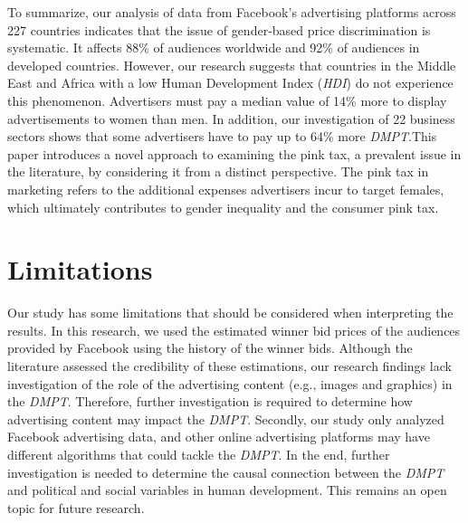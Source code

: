 \documentclass[twocolumn]{bmcart}\usepackage{lineno}
\begin{document}
To summarize, our analysis of data from Facebook's advertising platforms across 227 countries indicates that the issue of gender-based price discrimination is systematic. It affects 88\% of audiences worldwide and 92\% of audiences in developed countries. However, our research suggests that countries in the Middle East and Africa with a low Human Development Index (\emph{HDI}) do not experience this phenomenon. Advertisers must pay a median value of 14\% more to display advertisements to women than men. In addition, our investigation of 22 business sectors shows that some advertisers have to pay up to 64\% more \emph{DMPT}.This paper introduces a novel approach to examining the pink tax, a prevalent issue in the literature, by considering it from a distinct perspective. The pink tax in marketing refers to the additional expenses advertisers incur to target females, which ultimately contributes to gender inequality and the consumer pink tax. 
 
\color{black}



\section{Limitations}
\color{blue} Our study has some limitations that should be considered when interpreting the results. In this research, we used the estimated winner bid prices of the audiences provided by Facebook using the history of the winner bids. Although the literature assessed the credibility of these estimations, our research findings lack investigation of the role of the advertising content (e.g., images and graphics) in the \emph{DMPT}. Therefore, further investigation is required to determine how advertising content may impact the \emph{DMPT}. Secondly, our study only analyzed Facebook advertising data, and other online advertising platforms may have different algorithms that could tackle the \emph{DMPT}. \color{black}In the end, further investigation is needed to determine the causal connection between the \emph{DMPT} and political and social variables in human development. This remains an open topic for future research. 
\end{document}

